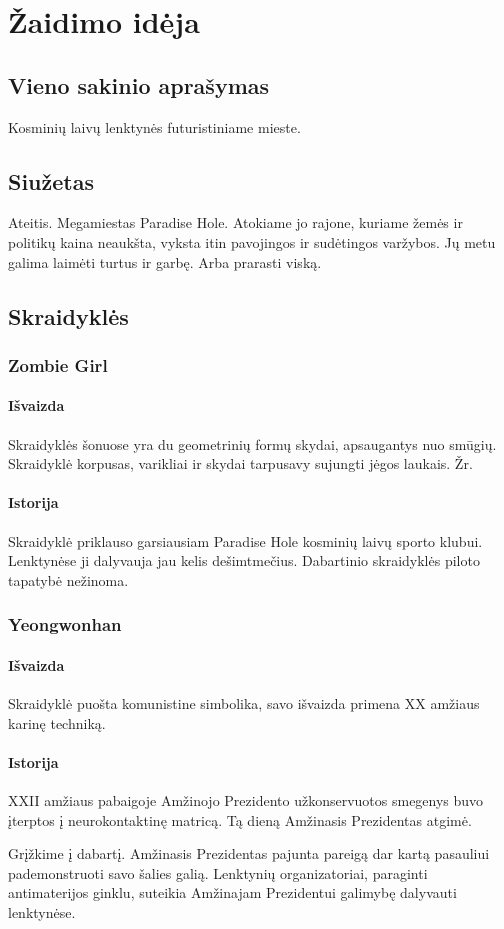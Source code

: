 \section{Žaidimo idėja}
\subsection{Vieno sakinio aprašymas}

Kosminių laivų lenktynės futuristiniame mieste.

\subsection{Siužetas}

Ateitis.
Megamiestas Paradise Hole.
Atokiame jo rajone, kuriame žemės ir politikų kaina neaukšta, vyksta itin pavojingos ir sudėtingos varžybos.
Jų metu galima laimėti turtus ir garbę.
Arba prarasti viską.

\subsection{Skraidyklės}

\newcommand{\ship}[3]{
    \subsubsection{#1}
    \paragraph{Išvaizda}
    #2
    \paragraph{Istorija}
    #3
}

\ship{
    Zombie Girl
}{
    Skraidyklės šonuose yra du geometrinių formų skydai, apsaugantys nuo smūgių.
    Skraidyklė korpusas, varikliai ir skydai tarpusavy sujungti jėgos laukais.
    Žr. \referToPicture{zombie-girl}
}{
    Skraidyklė priklauso garsiausiam Paradise Hole kosminių laivų sporto klubui.
    Lenktynėse ji dalyvauja jau kelis dešimtmečius.
    Dabartinio skraidyklės piloto tapatybė nežinoma.
}


\ship{
    Yeongwonhan
}{
    Skraidyklė puošta komunistine simbolika, savo išvaizda primena XX amžiaus karinę techniką.
}{
    XXII amžiaus pabaigoje Amžinojo Prezidento užkonservuotos smegenys buvo įterptos į neurokontaktinę matricą.
    Tą dieną Amžinasis Prezidentas atgimė.

    Grįžkime į dabartį.
    Amžinasis Prezidentas pajunta pareigą dar kartą pasauliui pademonstruoti savo šalies galią.
    Lenktynių organizatoriai, paraginti antimaterijos ginklu, suteikia Amžinajam Prezidentui galimybę dalyvauti lenktynėse.
}

